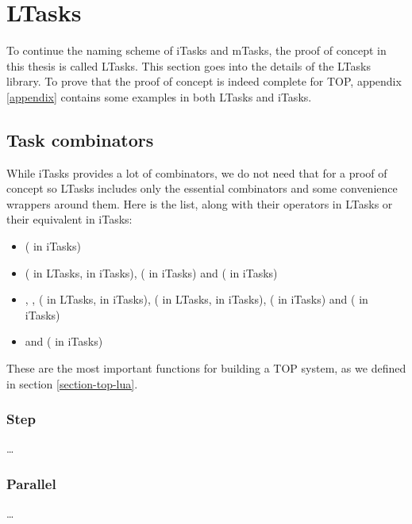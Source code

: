 \section{LTasks}\label{section-ltasks}
To continue the naming scheme of iTasks and mTasks, the proof of concept in this thesis is called LTasks. This section goes into the details of the LTasks library. To prove that the proof of concept is indeed complete for TOP, appendix \ref{appendix} contains some examples in both LTasks and iTasks.

\subsection{Task combinators}
While iTasks provides a lot of combinators, we do not need that for a proof of concept so LTasks includes only the essential combinators and some convenience wrappers around them. Here is the list, along with their operators in LTasks or their equivalent in iTasks:
\begin{itemize}
    \item {} ( in iTasks)
    \item {} (\lua{~} in LTasks, \clean{>>*} in iTasks),  (\clean{>>-} in iTasks) and  ( in iTasks)
    \item {}, ,  (\lua{&} in LTasks, \clean{-&&-} in iTasks),  (\lua{|} in LTasks, \clean{-||-} in iTasks),  (\clean{-||} in iTasks) and  (\clean{||-} in iTasks)
    \item {} and  ( in iTasks)
\end{itemize}

These are the most important functions for building a TOP system, as we defined in section \ref{section-top-lua}.

\subsubsection{Step}
\dots

\subsubsection{Parallel}
\dots

